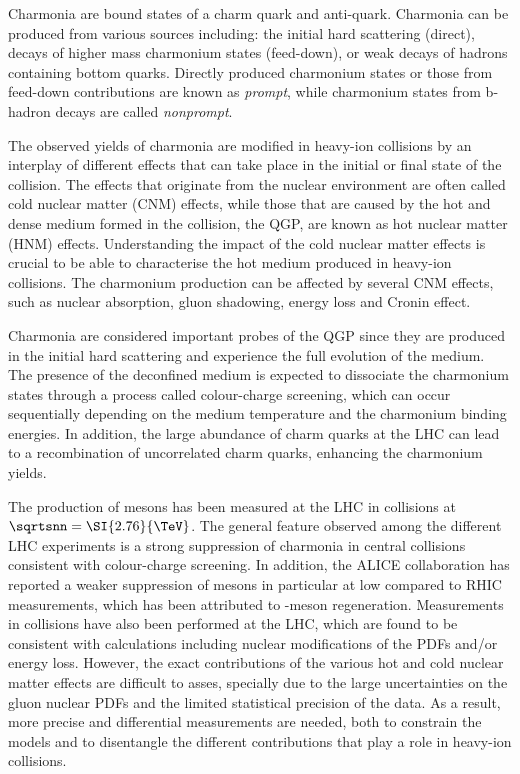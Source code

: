 Charmonia are bound states of a charm quark and anti-quark. Charmonia can be produced from various sources including: the initial hard scattering (direct), decays of higher mass charmonium states (feed-down), or weak decays of hadrons containing bottom quarks. Directly produced charmonium states or those from feed-down contributions are known as \textit{prompt}, while charmonium states from b-hadron decays are called \textit{nonprompt}.

The observed yields of charmonia are modified in heavy-ion collisions by an interplay of different effects that can take place in the initial or final state of the collision. The effects that originate from the nuclear environment are often called cold nuclear matter (CNM) effects, while those that are caused by the hot and dense medium formed in the collision, the QGP, are known as hot nuclear matter (HNM) effects. Understanding the impact of the cold nuclear matter effects is crucial to be able to characterise the hot medium produced in heavy-ion collisions. The charmonium production can be affected by several CNM effects, such as nuclear absorption, gluon shadowing, energy loss and Cronin effect.

Charmonia are considered important probes of the QGP since they are produced in the initial hard scattering and experience the full evolution of the medium. The presence of the deconfined medium is expected to dissociate the charmonium states through a process called colour-charge screening, which can occur sequentially depending on the medium temperature and the charmonium binding energies. In addition, the large abundance of charm quarks at the LHC can lead to a recombination of uncorrelated charm quarks, enhancing the charmonium yields.

The production of \JPsi mesons has been measured at the LHC in \RunPbPb collisions at $\sqrtsnn = \SI{2.76}{\TeV}$. The general feature observed among the different LHC experiments is a strong suppression of charmonia in central collisions consistent with colour-charge screening. In addition, the ALICE collaboration has reported a weaker suppression of \JPsi mesons in particular at low \pt compared to RHIC measurements, which has been attributed to \JPsi-meson regeneration. Measurements in \RunpPb collisions have also been performed at the LHC, which are found to be consistent with calculations including nuclear modifications of the PDFs and/or energy loss. However, the exact contributions of the various hot and cold nuclear matter effects are difficult to asses, specially due to the large uncertainties on the gluon nuclear PDFs and the limited statistical precision of the data. As a result, more precise and differential measurements are needed, both to constrain the models and to disentangle the different contributions that play a role in heavy-ion collisions.

